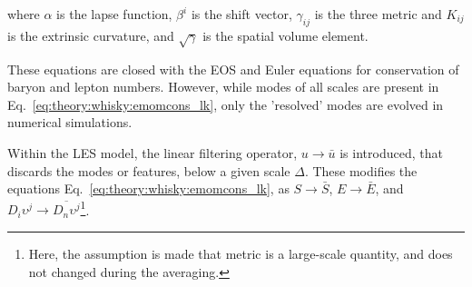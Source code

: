 %
where $\alpha$ is the lapse function, $\beta^i$ is the shift vector, 
$\gamma_{ij}$ is the three metric and $K_{ij}$ is the extrinsic curvature, 
and $\sqrt{\gamma}$ is the spatial volume element.
%

%
These equations are closed with the \ac{EOS} and Euler equations for conservation of 
baryon and lepton numbers.
%
However, while modes of all scales are present in 
Eq.~\eqref{eq:theory:whisky:emomcons_lk}, 
only the 'resolved' modes are evolved in numerical simulations. 


Within the \ac{LES} model, the linear filtering operator, $u\rightarrow \bar{u}$ is introduced, that 
discards the modes or features, below a given scale $\Delta$.
These modifies the equations Eq.~\eqref{eq:theory:whisky:emomcons_lk}, as $S\rightarrow\bar{S}$, $E\rightarrow\bar{E}$,
and $D_i\upsilon^j \rightarrow \overline{D_n\upsilon^j}$\footnote{
    Here, the assumption is made that metric is a large-scale quantity, 
    and does not changed during the averaging.
}.
%
%
%

